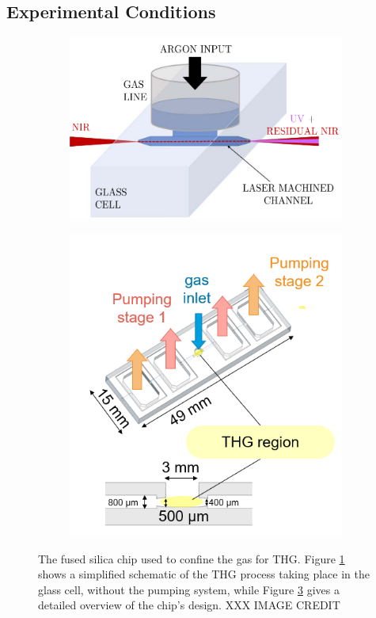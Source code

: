 \documentclass[a4paper]{jpconf}
\begin{document}
\subsection{Experimental Conditions}\label{sec:exp_cond} 
\begin{figure}[h]
\centering
 \begin{subfigure}{0.5\textwidth}
        \includegraphics[width=\textwidth]{im/schematic_galli}
   \caption{}\label{im:thg_schematic}
    \end{subfigure}  
 \begin{subfigure}{0.5\textwidth}
        \includegraphics[width=\textwidth]{im/new_chip_edited}
    \caption{}\label{im:new_chip}
    \end{subfigure}
\caption{The fused silica chip used to confine the gas for THG. 
Figure \ref{im:thg_schematic} shows a simplified schematic of the THG process taking place in the glass cell, without the pumping system, while Figure \ref{im:new_chip} gives a detailed overview of the chip's design. XXX IMAGE CREDIT}
\end{figure}
\end{document}
